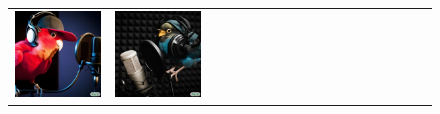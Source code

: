 \begin{figure}[ht!]
\begin{adjustwidth}{-0.8in}{-0.5in}
\begin{tabular}{cccccccccccccccccccc}
\multicolumn{2}{c}{\includegraphics[width=\threebythreecolwidth\textwidth]{figures/cherries/bird_sing2.jpg}} &
\multicolumn{2}{c}{\includegraphics[width=\threebythreecolwidth\textwidth]{figures/cherries/bird_sing3.jpg}} &&

\end{tabular}
\end{adjustwidth}
\end{figure}
